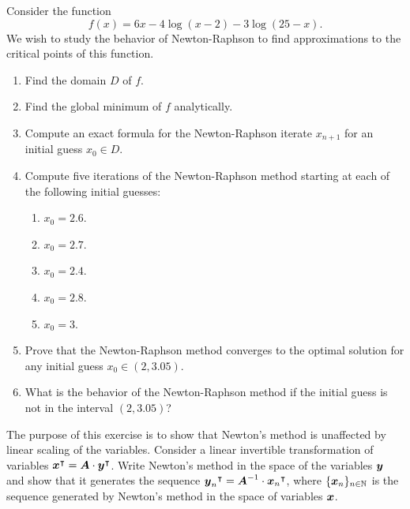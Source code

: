 \begin{problem}\cite[lec3\_newton\_mthd, 3.2]{Freund2004nonlinear}
Consider the function 
\begin{equation*}
f(x) = 6x -4\log(x-2) -3\log(25-x).
\end{equation*}
We wish to study the behavior of Newton-Raphson to find approximations to the critical points of this function.
\begin{enumerate}
	\item Find the domain $D$ of $f$.
	\item Find the global minimum of $f$ analytically. 
	\item Compute an exact formula for the Newton-Raphson iterate $x_{n+1}$ for an initial guess $x_0 \in D$.
	\item Compute five iterations of the Newton-Raphson method starting at each of the following initial guesses:
	\begin{enumerate}
		\item $x_0 = 2.6$.
		\item $x_0 = 2.7$.
		\item $x_0 = 2.4$.
		\item $x_0 = 2.8$.
		\item $x_0 = 3$.
	\end{enumerate}
	\item Prove that the Newton-Raphson method converges to the optimal solution for any initial guess $x_0 \in (2,3.05)$.
	\item What is the behavior of the Newton-Raphson method if the initial guess is not in the interval $(2,3.05)$?
\end{enumerate}
\end{problem}

\begin{problem}[Intermediate]\cite[p.91 \#1.4.1]{bertsekas1999nonlinear}
The purpose of this exercise is to show that Newton's method is unaffected by linear scaling of the variables.  Consider a linear invertible transformation of variables ${\boldsymbol{x}}^\intercal=\boldsymbol{A} \cdot {\boldsymbol{y}}^\intercal$.  Write Newton's method in the space of the variables $\boldsymbol{y}$ and show that it generates the sequence ${\boldsymbol{y}_n}^\intercal = \boldsymbol{A}^{-1}\cdot {\boldsymbol{x}_n}^\intercal$, where $\{ \boldsymbol{x}_n \}_{n \in \mathbb{N}}$ is the sequence generated by Newton's method in the space of variables $\boldsymbol{x}$.
\end{problem}

